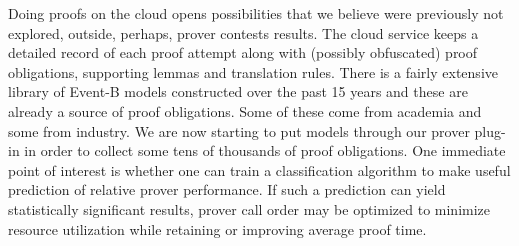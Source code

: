 \documentclass[twocolumn,a4paper,10pt]{article}
\begin{document}
Doing proofs on the cloud opens possibilities that we believe were previously not explored, outside, perhaps, prover contests results. The cloud service keeps a detailed record of each proof attempt along with (possibly obfuscated) proof obligations, supporting lemmas and translation rules. There is a fairly extensive library of Event-B models constructed over the past 15 years and these are already a source of proof obligations. Some of these come from academia and some from industry. We are now starting to put models through our prover plug-in in order to collect some tens of thousands of proof obligations. One immediate point of interest is whether one can train a classification algorithm to make useful prediction of relative prover performance. If such a prediction can yield statistically significant results, prover call order may be optimized to minimize resource utilization while retaining or improving average proof time. 



\end{document}
